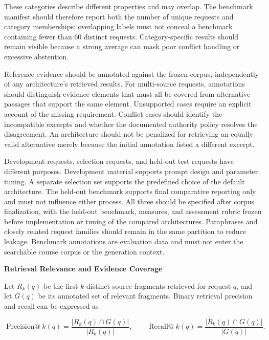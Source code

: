 \documentclass[12pt,a4paper]{report}
\numberwithin{equation}{chapter}
\begin{document}
These categories describe different properties and may overlap. The benchmark manifest should therefore report both the number of unique requests and category memberships; overlapping labels must not conceal a benchmark containing fewer than 60 distinct requests. Category-specific results should remain visible because a strong average can mask poor conflict handling or excessive abstention.

Reference evidence should be annotated against the frozen corpus, independently of any architecture's retrieved results. For multi-source requests, annotations should distinguish evidence elements that must all be covered from alternative passages that support the same element. Unsupported cases require an explicit account of the missing requirement. Conflict cases should identify the incompatible excerpts and whether the documented authority policy resolves the disagreement. An architecture should not be penalized for retrieving an equally valid alternative merely because the initial annotation listed a different excerpt.

Development requests, selection requests, and held-out test requests have different purposes. Development material supports prompt design and parameter tuning. A separate selection set supports the predefined choice of the default architecture. The held-out benchmark supports final comparative reporting only and must not influence either process. All three should be specified after corpus finalization, with the held-out benchmark, measures, and assessment rubric frozen before implementation or tuning of the compared architectures. Paraphrases and closely related request families should remain in the same partition to reduce leakage. Benchmark annotations are evaluation data and must not enter the searchable course corpus or the generation context.

\par\medskip
\textbf{Retrieval Relevance and Evidence Coverage}

Let \(R_k(q)\) be the first \(k\) distinct source fragments retrieved for request \(q\), and let \(G(q)\) be its annotated set of relevant fragments. Binary retrieval precision and recall can be expressed as

\begin{equation}
\label{eq:retrieval-precision-recall}
\operatorname{Precision@}k(q)=
\frac{|R_k(q)\cap G(q)|}{|R_k(q)|},
\qquad
\operatorname{Recall@}k(q)=
\frac{|R_k(q)\cap G(q)|}{|G(q)|}.
\end{equation}
\end{document}
